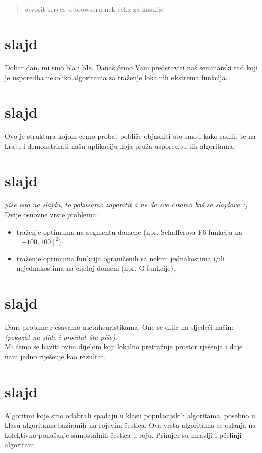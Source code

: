 \documentclass[a4paper,10pt]{article}
\title{}
\author{}
\begin{document}
\maketitle

\begin{abstract}
otvorit server u browseru nek ceka za kasnije
\end{abstract}

\section{slajd}
Dobar dan, mi smo bla i ble. Danas \' cemo Vam predstaviti na\v s seminarski rad koji je usporedba nekoliko algoritama za tra\v zenje lokalnih ekstrema funkcija.

\section{slajd}
Ovo je struktura kojom \' cemo probat pobli\v ze objasniti sto smo i kako radili, te na kraju i demonstrirati na\v su aplikaciju koja pru\v za usporedbu tih algoritama.

\section{slajd}
\emph{pi\v se isto na slajdu, to poku\v samo zapamtit a ne da sve \v citamo ba\v s sa slajdova :)}
Dvije osnovne vrste problema:
  \begin{itemize}
   \item tra\v zenje optimuma na segmentu domene (npr. Schafferova F6 funkcija na $[-100,100]^2$)
   \item tra\v zenje optimuma funkcija ograni\v cenih sa nekim jednakostima i/ili nejednakostima na cijeloj domeni (npr. G funkcije).
  \end{itemize}

\section{slajd}
Dane problme rje\v savamo metaheuristikama. One se dijle na sljede\' ci na\v cin: \emph{(pokazat na slide i pro\v citat \v sta pi\v se)}.\\
Mi \' cemo se baviti ovim dijelom koji lokalno pretra\v zuje prostor rje\v senja i daje nam jedno rije\v senje kao rezultat.

\section{slajd}
Algoritmi koje smo odabrali spadaju u klasu populacijskih algoritama, posebno u klasu algoritama baziranih na rojevim \v cestica. Ova vrsta algoritama se oslanja na kolektivno pona\v sanje samostalnih \v cestica u roju. Primjer su mravlji i p\v celinji algoritam.
\end{document}
